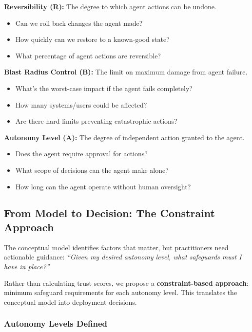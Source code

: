 \textbf{Reversibility (R):} The degree to which agent actions can be undone.
\begin{itemize}
    \item Can we roll back changes the agent made?
    \item How quickly can we restore to a known-good state?
    \item What percentage of agent actions are reversible?
\end{itemize}

\textbf{Blast Radius Control (B):} The limit on maximum damage from agent failure.
\begin{itemize}
    \item What's the worst-case impact if the agent fails completely?
    \item How many systems/users could be affected?
    \item Are there hard limits preventing catastrophic actions?
\end{itemize}

\textbf{Autonomy Level (A):} The degree of independent action granted to the agent.
\begin{itemize}
    \item Does the agent require approval for actions?
    \item What scope of decisions can the agent make alone?
    \item How long can the agent operate without human oversight?
\end{itemize}

\subsection{From Model to Decision: The Constraint Approach}
\label{subsec:constraint-approach}

The conceptual model identifies factors that matter, but practitioners need actionable guidance: \textit{``Given my desired autonomy level, what safeguards must I have in place?''}

Rather than calculating trust scores, we propose a \textbf{constraint-based approach}: minimum safeguard requirements for each autonomy level. This translates the conceptual model into deployment decisions.

\subsubsection{Autonomy Levels Defined}

